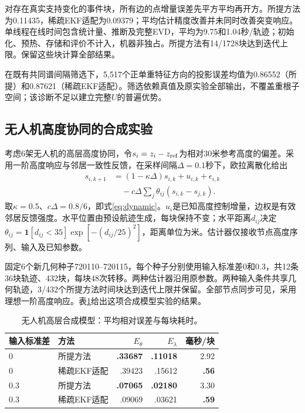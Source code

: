 \documentclass[journal]{IEEEtran}
\begin{document}
对存在真实支持变化的事件块，所有边的点增量误差先平方平均再开方。所提方法为0.11435，稀疏EKF适配为0.09379；平均估计精度改善并未同时改善突变响应。单线程在线时间包含统计量、推断及完整EVD，平均为9.75和1.04秒/轨迹；初始化、预热、存储和评价不计入，机器非独占。所提方法有14/1728块达到迭代上限。保留这些块计算全部结果。

在既有共同谱间隔筛选下，5,517个正单重特征方向的投影误差均值为0.86552（所提）和0.87621（稀疏EKF适配）。筛选依赖真值及原实验全部输出，不覆盖重根子空间；该诊断不足以建立完整$U$的普遍优势。

\subsection{无人机高度协同的合成实验}
考虑6架无人机的高层高度协同，令$s_i=z_i-z_{\rm ref}$为相对30米参考高度的偏差。采用一阶高度响应与邻居一致性反馈\cite{consensus}，在采样间隔$\Delta=0.1$秒下，欧拉离散化给出
\begin{equation}
\begin{split}
s_{i,k+1}&=(1-\kappa\Delta)s_{i,k}+u_{i,k}+\epsilon_{i,k}\\
&\quad-c\Delta\sum_j\theta_{ij}(s_{i,k}-s_{j,k}).
\end{split}
\end{equation}
取$\kappa=0.5$、$c\Delta=0.8/6$，即式\eqref{eq:dynamic}。$u_i$是已知高度控制增量，边权是有效邻居反馈强度。水平位置由预设航迹生成，每块保持不变；水平距离$d_{ij}$决定$\theta_{ij}=\mathbf1[d_{ij}<35]\exp[-(d_{ij}/25)^2]$，距离单位为米。估计器仅接收节点高度序列、输入及已知参数。

固定6个新几何种子720110--720115，每个种子分别使用输入标准差0和0.3，共12条36块轨迹、432块，每块48次转移。两种估计器沿用原参数。两种输入条件共享几何轨迹，3/432个所提方法时间块达到迭代上限并保留。全部节点同步可见，采用理想一阶高度响应。表\ref{tab:uav}给出这项合成模型实验的结果。

\begin{table}[t]\centering\scriptsize
\caption{无人机高层合成模型：平均相对误差与每块耗时。}\label{tab:uav}
\setlength{\tabcolsep}{4pt}\begin{tabular}{llrrr}\toprule
输入标准差 & 方法 & $E_\theta$ & $E_\lambda$ & 毫秒/块\\\midrule
0 & 所提方法 & \textbf{.33687} & \textbf{.11018} & 2.92\\
0 & 稀疏EKF适配 & .39423 & .15612 & \textbf{.56}\\
0.3 & 所提方法 & \textbf{.07065} & \textbf{.02180} & 3.30\\
0.3 & 稀疏EKF适配 & .09069 & .03621 & \textbf{.59}\\\bottomrule
\end{tabular}\end{table}
\end{document}

